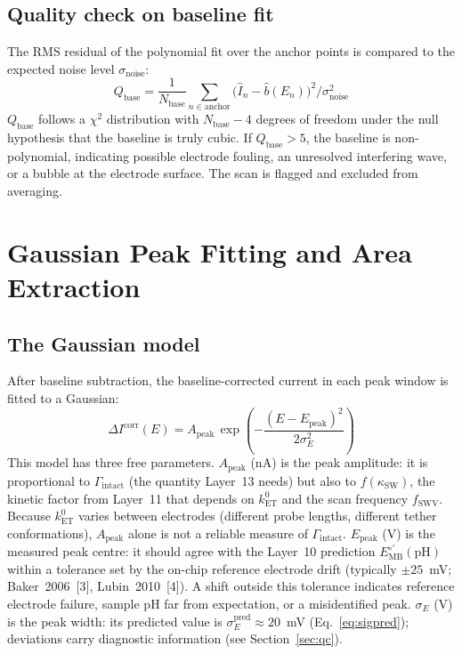 \documentclass[10pt,a4paper]{article}
\numberwithin{equation}{section}
\newcommand{\cit}[1]{[#1]}
\newcommand{\kET}{k_{\text{ET}}^{0}}
\newcommand{\Eo}{E^{\circ\prime}}
\newcommand{\Apk}{A_{\text{peak}}}
\newcommand{\Epk}{E_{\text{peak}}}
\newcommand{\DI}{\Delta I}
\begin{document}
\subsection{Quality check on baseline fit}

The RMS residual of the polynomial fit over the anchor points is compared
to the expected noise level $\sigma_\text{noise}$:
\begin{equation}
  Q_\text{base} = \frac{1}{N_\text{base}}\sum_{n \in \text{anchor}}
  \bigl(\hat{I}_n - \hat{b}(E_n)\bigr)^2 / \sigma_\text{noise}^2
  \label{eq:Qbase}
\end{equation}
$Q_\text{base}$ follows a $\chi^2$ distribution with $N_\text{base} - 4$
degrees of freedom under the null hypothesis that the baseline is truly
cubic. If $Q_\text{base} > 5$, the baseline is non-polynomial, indicating
possible electrode fouling, an unresolved interfering wave, or a bubble at
the electrode surface. The scan is flagged and excluded from averaging.

\section{Gaussian Peak Fitting and Area Extraction}
\label{sec:fit}

\subsection{The Gaussian model}

After baseline subtraction, the baseline-corrected current in each peak
window is fitted to a Gaussian:
\begin{equation}
  \DI^\text{corr}(E) = \Apk\,\exp\!\!\left(-\frac{(E - \Epk)^2}{2\sigma_E^2}\right)
  \label{eq:gauss}
\end{equation}
This model has three free parameters. $\Apk$ (nA) is the peak
amplitude: it is proportional to $\Gamma_\text{intact}$ (the quantity
Layer~13 needs) but also to $f(\kappa_\text{SW})$, the kinetic factor
from Layer~11 that depends on $\kET$ and the scan frequency $f_\text{SWV}$.
Because $\kET$ varies between electrodes (different probe lengths, different
tether conformations), $\Apk$ alone is not a reliable measure of
$\Gamma_\text{intact}$. $\Epk$ (V) is the measured peak centre: it should
agree with the Layer~10 prediction $\Eo_\text{MB}(\text{pH})$ within a
tolerance set by the on-chip reference electrode drift (typically
$\pm 25$~mV; Baker~2006~\cit{3}, Lubin~2010~\cit{4}). A shift outside this
tolerance indicates reference electrode failure, sample pH far from
expectation, or a misidentified peak. $\sigma_E$ (V) is the peak width:
its predicted value is $\sigma_E^\text{pred} \approx 20$~mV
(Eq.~\ref{eq:sigpred}); deviations carry diagnostic information (see
Section~\ref{sec:qc}).
\end{document}
